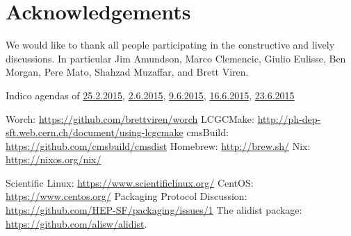 \documentclass[12pt,a4paper]{article}
\begin{document}
\section*{Acknowledgements}
We would like to thank all people participating in the constructive and lively discussions. In particular Jim Amundson, Marco Clemencic, Giulio Eulisse, Ben Morgan, Pere Mato, Shahzad Muzaffar, and Brett Viren. 

\begin{thebibliography}{9}
 Indico agendas of \href{https://indico.cern.ch/event/373973/}{25.2.2015}, \href{https://indico.cern.ch/event/398344/}{2.6.2015}, \href{https://indico.cern.ch/event/400272/}{9.6.2015}, \href{https://indico.cern.ch/event/402229/}{16.6.2015}, \href{https://indico.cern.ch/event/403790/}{23.6.2015}

 Worch: \url{https://github.com/brettviren/worch}
 LCGCMake: \url{http://ph-dep-sft.web.cern.ch/document/using-lcgcmake}
 cmsBuild: \url{https://github.com/cmsbuild/cmsdist}
 Homebrew: \url{http://brew.sh/}
 Nix: \url{https://nixos.org/nix/}

 Scientific Linux: \url{https://www.scientificlinux.org/}
 CentOS: \url{https://www.centos.org/}
 Packaging Protocol Discussion:  \url{https://github.com/HEP-SF/packaging/issues/1}
 The alidist package: \url{https://github.com/alisw/alidist}.
\end{thebibliography}
\end{document}
